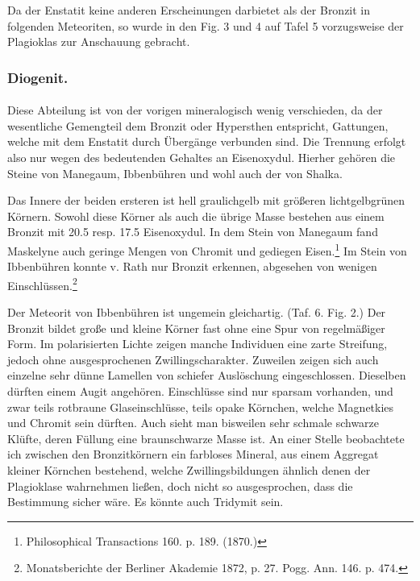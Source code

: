 \documentclass[a4paper, 11pt, oneside, polutonikogreek, german]{article}
\begin{document}
Da der Enstatit keine anderen Erscheinungen darbietet als der Bronzit in folgenden Meteoriten, so wurde in den Fig. 3 und 4 auf Tafel 5 vorzugsweise der Plagioklas zur Anschauung gebracht.

\subsubsection{Diogenit.}
\paragraph{}
Diese Abteilung ist von der vorigen mineralogisch wenig verschieden, da der wesentliche Gemengteil dem Bronzit oder Hypersthen entspricht, Gattungen, welche mit dem Enstatit durch Übergänge verbunden sind. Die Trennung erfolgt also nur wegen des bedeutenden Gehaltes an Eisenoxydul. Hierher gehören die Steine von Manegaum, Ibbenbühren und wohl auch der von Shalka.

Das Innere der beiden ersteren ist hell graulichgelb mit größeren lichtgelbgrünen Körnern. Sowohl diese Körner als auch die übrige Masse bestehen aus einem Bronzit mit 20.5 resp. 17.5 Eisenoxydul. In dem Stein von Manegaum fand Maskelyne auch geringe Mengen von Chromit und gediegen Eisen.\footnote{Philosophical Transactions 160. p. 189. (1870.)} Im Stein von Ibbenbühren konnte v. Rath nur Bronzit erkennen, abgesehen von wenigen Einschlüssen.\footnote{Monatsberichte der Berliner Akademie 1872, p. 27. Pogg. Ann. 146. p. 474.}

Der Meteorit von Ibbenbühren ist ungemein gleichartig. (Taf. 6. Fig. 2.) Der Bronzit bildet große und kleine Körner fast ohne eine Spur von regelmäßiger Form. Im polarisierten Lichte zeigen manche Individuen eine zarte Streifung, jedoch ohne ausgesprochenen Zwillingscharakter. Zuweilen zeigen sich auch einzelne sehr dünne Lamellen von schiefer Auslöschung eingeschlossen. Dieselben dürften einem Augit angehören. Einschlüsse sind nur sparsam vorhanden, und zwar teils rotbraune Glaseinschlüsse, teils opake Körnchen, welche Magnetkies und Chromit sein dürften. Auch sieht man bisweilen sehr schmale schwarze Klüfte, deren Füllung eine braunschwarze Masse ist. An einer Stelle beobachtete ich zwischen den Bronzitkörnern ein farbloses Mineral, aus einem Aggregat kleiner Körnchen bestehend, welche Zwillingsbildungen ähnlich denen der Plagioklase wahrnehmen ließen, doch nicht so ausgesprochen, dass die Bestimmung sicher wäre. Es könnte auch Tridymit sein.
\end{document}
